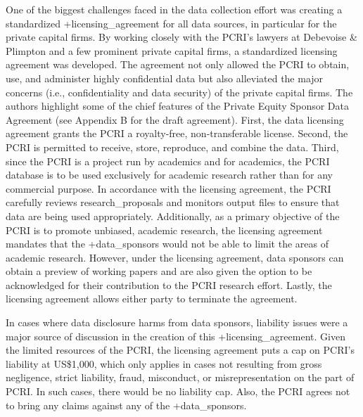 \documentclass[
]{WileySix}
\begin{document}
One of the biggest challenges faced in the data collection effort was creating a standardized +licensing\_agreement\textbar{} for all data sources, in particular for the private capital firms. By working closely with the PCRI's lawyers at Debevoise \& Plimpton and a few prominent private capital firms, a standardized licensing agreement was developed. The agreement not only allowed the PCRI to obtain, use, and administer highly confidential data but also alleviated the major concerns (i.e., confidentiality and data security) of the private capital firms. The authors highlight some of the chief features of the Private Equity Sponsor Data Agreement (see Appendix B for the draft agreement). First, the data licensing agreement grants the PCRI a royalty-free, non-transferable license. Second, the PCRI is permitted to receive, store, reproduce, and combine the data. Third, since the PCRI is a project run by academics and for academics, the PCRI database is to be used exclusively for academic research rather than for any commercial purpose. In accordance with the licensing agreement, the PCRI carefully reviews research\_proposals and monitors output files to ensure that data are being used appropriately. Additionally, as a primary objective of the PCRI is to promote unbiased, academic research, the licensing agreement mandates that the +data\_sponsors\textbar{} would not be able to limit the areas of academic research. However, under the licensing agreement, data sponsors can obtain a preview of working papers and are also given the option to be acknowledged for their contribution to the PCRI research effort. Lastly, the licensing agreement allows either party to terminate the agreement.

In cases where data disclosure harms from data sponsors, liability issues were a major source of discussion in the creation of this +licensing\_agreement\textbar. Given the limited resources of the PCRI, the licensing agreement puts a cap on PCRI's liability at US\$1,000, which only applies in cases not resulting from gross negligence, strict liability, fraud, misconduct, or misrepresentation on the part of PCRI. In such cases, there would be no liability cap. Also, the PCRI agrees not to bring any claims against any of the +data\_sponsors\textbar.
\end{document}
